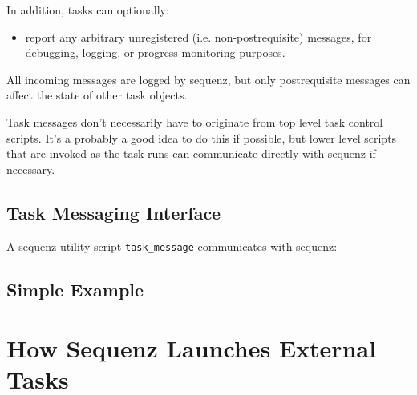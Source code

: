 \documentclass[11pt,a4paper]{article}
\begin{document}
In addition, tasks can optionally:

\begin{itemize}
\item report any arbitrary unregistered (i.e. non-postrequisite)
messages, for debugging, logging, or progress monitoring purposes.
\end{itemize}

All incoming messages are logged by sequenz, but only postrequisite
messages can affect the state of other task objects.

Task messages don't necessarily have to originate from top level task
control scripts. It's a probably a good idea to do this if possible, but
lower level scripts that are invoked as the task runs can communicate
directly with sequenz if necessary.

\subsection{Task Messaging Interface}

A sequenz utility script \verb=task_message= communicates with sequenz:


\subsection{Simple Example}

\section{How Sequenz Launches External Tasks}
\end{document}
